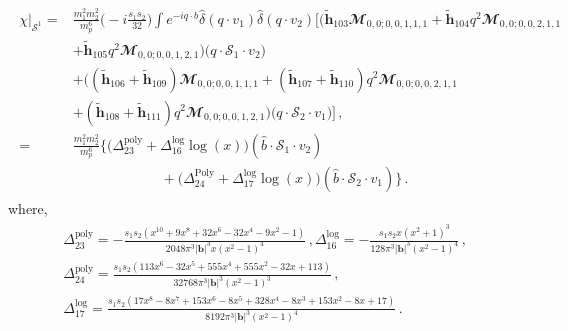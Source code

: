 \begin{align}
\begin{split}
\chi\Big|_{\mathcal{S}^1}
=&\frac{m_1^2 m_2^2}{m_p^6}\Big(-i\frac{s_1s_2}{32}\Big)\int e^{-i q\cdot b}\hat\delta(q\cdot v_1)\hat\delta(q\cdot v_2)\Bigg[\Bigg(\boldsymbol{\tilde h}_{103}\mathbfcal{M}_{0,0;0,0,1,1,1}
+\boldsymbol{\tilde h}_{104}q^2\mathbfcal{M}_{0,0;0,0,2,1,1}\\
&+\boldsymbol{\tilde h}_{105}q^2\mathbfcal{M}_{0,0;0,0,1,2,1}\Bigg)\big(q\cdot\mathcal{S}_1\cdot v_2\big)\\
&+\Bigg((\boldsymbol{\tilde h}_{106}+\boldsymbol{\tilde h}_{109})\mathbfcal{M}_{0,0;0,0,1,1,1}
+(\boldsymbol{\tilde h}_{107}+\boldsymbol{\tilde h}_{110})q^2\mathbfcal{M}_{0,0;0,0,2,1,1}\\
&+(\boldsymbol{\tilde h}_{108}+\boldsymbol{\tilde h}_{111})q^2\mathbfcal{M}_{0,0;0,0,1,2,1}\Bigg)\big(q\cdot\mathcal{S}_2\cdot v_1\big)\Bigg]\,,\\
=&\frac{m_1^2 m_2^2}{m_p^6}\Bigg\{\Bigg(\Delta_{\mathfrak{23}}^{\textrm{poly}}+\Delta_{\mathfrak{16}}^{\textrm{log}}\log(x)\Bigg)(\hat b\cdot \mathcal{S}_1\cdot v_2)\\
&\qquad\qquad\qquad\;
+\Bigg(\Delta_{\mathfrak{24}}^{\textrm{Poly}}+\Delta_{\mathfrak{17}}^{{\textrm{log}}}\log(x)\Bigg)(\hat b\cdot \mathcal{S}_2\cdot v_1)\Bigg\}\,.
\end{split}
\end{align}
where, 
\begin{align}
    \begin{split}
   & \Delta_{\mathfrak{23}}^{\textrm{poly}}=-\frac{s_{1}s_{2} \left(x^{10}+9 x^8+32 x^6-32 x^4-9 x^2-1\right)}{2048 \pi ^3 |\boldsymbol{b}|^3 x \left(x^2-1\right)^4 }\,,\Delta_{\mathfrak{16}}^{\textrm{log}}=-\frac{s_{1} s_{2} x \left(x^2+1\right)^3}{128 \pi ^3 |\boldsymbol{b}|^3 \left(x^2-1\right)^4 }\,,
   \\& \Delta_{\mathfrak{24}}^{\textrm{poly}}=\frac{s_{1} s_{2} \left(113 x^6-32 x^5+555 x^4+555 x^2-32 x+113\right)}{32768 \pi ^3 |\boldsymbol{b}|^3 \left(x^2-1\right)^3 }\,,\\&\Delta_{\mathfrak{17}}^{{\textrm{log}}}=\frac{s_{1} s_{2} \left(17 x^8-8 x^7+153 x^6-8 x^5+328 x^4-8 x^3+153 x^2-8 x+17\right)}{8192 \pi ^3 |\boldsymbol{b}|^3 \left(x^2-1\right)^4}\,.  \label{eqt17} 
     \end{split}
\end{align} 
